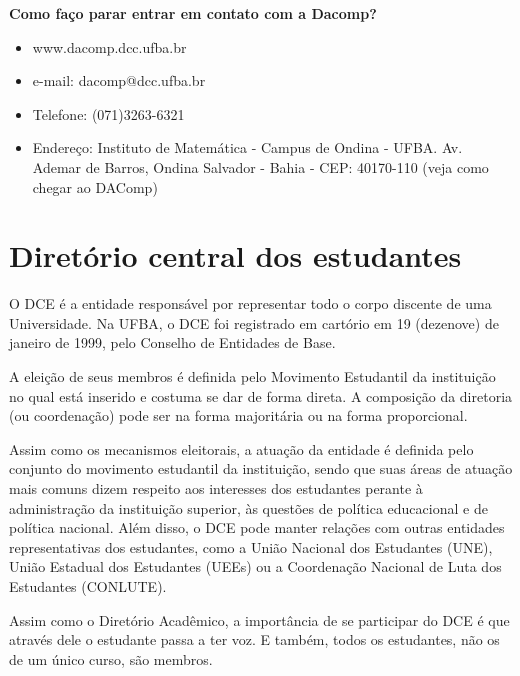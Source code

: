  \textbf{Como faço parar entrar em contato com a Dacomp?}
     \begin{itemize}
     
  \item www.dacomp.dcc.ufba.br
 \item e-mail: dacomp@dcc.ufba.br
 \item Telefone: (071)3263-6321
 \item Endereço: Instituto de Matemática - Campus de Ondina - UFBA. Av. Ademar de Barros, Ondina Salvador - Bahia - CEP: 40170-110 (veja como chegar ao DAComp)\\
     \end{itemize}

\section{Diretório central dos estudantes}

O DCE é a entidade responsável por representar todo o corpo discente de uma Universidade. Na UFBA, o DCE foi registrado em cartório em 19 (dezenove) de janeiro de 1999, pelo Conselho de Entidades de Base.
 
 A eleição de seus membros é definida pelo Movimento Estudantil da instituição no qual está inserido e costuma se dar de forma direta. A composição da diretoria (ou coordenação) pode ser na forma majoritária ou na forma proporcional.
 
Assim como os mecanismos eleitorais, a atuação da entidade é definida pelo conjunto do movimento estudantil da instituição, sendo que suas áreas de atuação mais comuns dizem respeito aos interesses dos estudantes perante à administração da instituição superior, às questões de política educacional e de política nacional. Além disso, o DCE pode manter relações com outras entidades representativas dos estudantes, como a União Nacional dos Estudantes (UNE), União Estadual dos Estudantes (UEEs) ou a Coordenação Nacional de Luta dos Estudantes (CONLUTE).
 
  Assim como o Diretório Acadêmico, a importância de se participar do DCE é que através dele o estudante passa a ter voz. E também, todos os estudantes, não os de um único curso, são membros.
  
